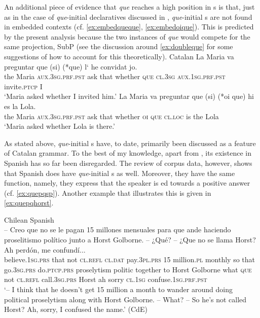 An additional piece of evidence that  \emph{que} reaches a high position  in s is that, just as in the case of \emph{que}-initial declaratives discussed in , \emph{que}-initial s are not found in embedded contexts (cf. \ref{ex:embedqueque}, \ref{ex:embedoique}). This is predicted by the present analysis  because the two instances of \emph{que} would compete for the same projection, SubP (see  the discussion around  \eqref{ex:doubleque} for some suggestions of how to account for this theoretically).
\ea Catalan
\ea\label{ex:embedqueque}\gll La Maria va preguntar que (si) (*que) l‘ he convidat jo. \\
the Maria \textsc{aux.3sg.prf.pst} ask that whether \textsc{que} \textsc{cl.3sg} \textsc{aux.1sg.prf.pst} invite.\textsc{ptcp} I\\
\glt `Maria asked whether I invited him.'
\ex\label{ex:embedoique}\gll La Maria va preguntar que (si) (*oi que) hi es la Lola.\\
the Maria \textsc{aux.3sg.prf.pst} ask that whether \textsc{oi} \textsc{que} \textsc{cl.loc} is the Lola\\
\glt `Maria asked whether Lola is there.'
\z
\z

As stated above, \emph{que}-initial s have, to date, primarily been discussed as a feature of Catalan grammar. To the best of my knowledge, apart from \citet{Hualde1992}, its existence in Spanish has so far been  disregarded. The review of corpus data, however, shows that Spanish does have \emph{que}-initial s as well. Moreover,  they  have the same function, namely, they express that the speaker is ed towards a positive answer (cf. \ref{ex:quepqsp}). Another example that illustrates this is given in \eqref{ex:quepqhorst}.

\ea \label{ex:quepqhorst}  Chilean Spanish \\\gll -- Creo que no se le pagan 15 millones mensuales para que ande haciendo proselitismo político junto a Horst Golborne.  -- ¿Qué? -- ¿Que no se llama Horst? Ah perdón, me confundí... \\
{} believe.\textsc{1sg.prs} that not \textsc{cl.refl} \textsc{cl.dat} pay.\textsc{3pl.prs} 15 million.\textsc{pl} monthly so that go.\textsc{3sg.prs} do.\textsc{ptcp.prs} proselytism politic together to Horst Golborne {} what {} \textsc{que} not \textsc{cl.refl} call.\textsc{3sg.prs} Horst ah sorry \textsc{cl.1sg} confuse.\textsc{1sg.prf.pst} \\
\glt `-- I think that he doesn't get 15 million a month to wander around doing political proselytism along with Horst Golborne. -- What? -- So he's not called Horst? Ah, sorry, I confused the name.' (CdE)
\z

